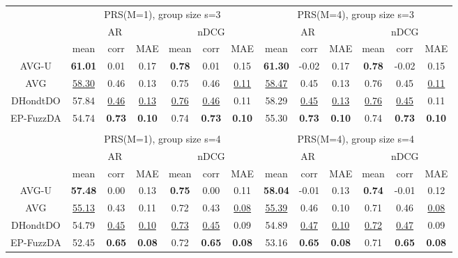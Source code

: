 \begin{tabular}{ c | c c c | c c c || c c c | c c c}

\multicolumn{1}{c}{} & \multicolumn{6}{c}{PRS(M=1), group size s=3} & \multicolumn{6}{c}{PRS(M=4), group size s=3} \\
\multicolumn{1}{c}{} & \multicolumn{3}{c}{AR} & \multicolumn{3}{c}{nDCG} & \multicolumn{3}{c}{AR} & \multicolumn{3}{c}{nDCG} \\
& mean & corr & MAE & mean & corr & MAE & mean & corr & MAE & mean & corr & MAE \\
\hline
AVG-U & \textbf{61.01} & 0.01 & 0.17 & \textbf{0.78} & 0.01 & 0.15 & \textbf{61.30} & -0.02 & 0.17 & \textbf{0.78} & -0.02 & 0.15 \\
AVG & \underline{58.30} & 0.46 & 0.13 & 0.75 & 0.46 & \underline{0.11} & \underline{58.47} & 0.45 & 0.13 & 0.76 & 0.45 & \underline{0.11} \\
DHondtDO & 57.84 & \underline{0.46} & \underline{0.13} & \underline{0.76} & \underline{0.46} & 0.11 & 58.29 & \underline{0.45} & \underline{0.13} & \underline{0.76} & \underline{0.45} & 0.11 \\
EP-FuzzDA & 54.74 & \textbf{0.73} & \textbf{0.10} & 0.74 & \textbf{0.73} & \textbf{0.10} & 55.30 & \textbf{0.73} & \textbf{0.10} & 0.74 & \textbf{0.73} & \textbf{0.10} \\

\multicolumn{12}{c}{} \\
\multicolumn{1}{c}{} & \multicolumn{6}{c}{PRS(M=1), group size s=4} & \multicolumn{6}{c}{PRS(M=4), group size s=4} \\
\multicolumn{1}{c}{} & \multicolumn{3}{c}{AR} & \multicolumn{3}{c}{nDCG} & \multicolumn{3}{c}{AR} & \multicolumn{3}{c}{nDCG} \\
& mean & corr & MAE & mean & corr & MAE & mean & corr & MAE & mean & corr & MAE \\
\hline
AVG-U & \textbf{57.48} & 0.00 & 0.13 & \textbf{0.75} & 0.00 & 0.11 & \textbf{58.04} & -0.01 & 0.13 & \textbf{0.74} & -0.01 & 0.12 \\
AVG & \underline{55.13} & 0.43 & 0.11 & 0.72 & 0.43 & \underline{0.08} & \underline{55.39} & 0.46 & 0.10 & 0.71 & 0.46 & \underline{0.08} \\
DHondtDO & 54.79 & \underline{0.45} & \underline{0.10} & \underline{0.73} & \underline{0.45} & 0.09 & 54.89 & \underline{0.47} & \underline{0.10} & \underline{0.72} & \underline{0.47} & 0.09 \\
EP-FuzzDA & 52.45 & \textbf{0.65} & \textbf{0.08} & 0.72 & \textbf{0.65} & \textbf{0.08} & 53.16 & \textbf{0.65} & \textbf{0.08} & 0.71 & \textbf{0.65} & \textbf{0.08} \\


\end{tabular}
